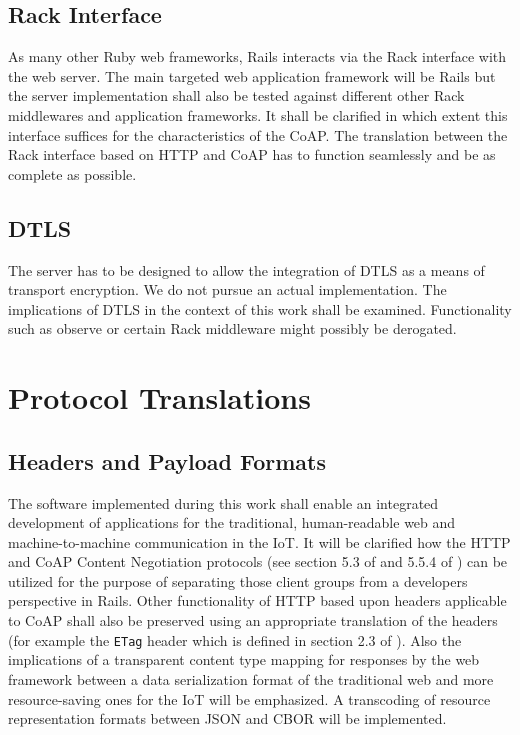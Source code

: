 	\subsection{Rack Interface}

		As many other Ruby web frameworks, \ac{Rails} interacts via the Rack
		interface with the web server. The main targeted web application
		framework will be \ac{Rails} but the server implementation shall also
		be tested against different other Rack middlewares and application
		frameworks. It shall be clarified in which extent this interface
		suffices for the characteristics of the \acf{CoAP}. The translation
		between the Rack interface based on \ac{HTTP} and \ac{CoAP} has to
		function seamlessly and be as complete as possible.

	\subsection{\acs{DTLS}}

		The server has to be designed to allow the integration of \ac{DTLS}
		\cite{dtls} as a means of transport encryption. We do not pursue an
		actual implementation. The implications of \ac{DTLS} in the context of
		this work shall be examined. Functionality such as observe or certain
		Rack middleware might possibly be derogated.

\section{Protocol Translations}


	\subsection{Headers and Payload Formats}


		The software implemented during this work shall enable an integrated
		development of applications for the traditional, human-readable web and
		machine-to-machine communication in the \ac{IoT}. It will be clarified
		how the \ac{HTTP} and \ac{CoAP} Content Negotiation protocols (see
		section 5.3 of \cite{http-1} and 5.5.4 of \cite{coap}) can be utilized
		for the purpose of separating those client groups from a developers
		perspective in \ac{Rails}. Other functionality of \ac{HTTP} based upon
		headers applicable to \ac{CoAP} shall also be preserved using an
		appropriate translation of the headers (for example the \texttt{ETag}
		header which is defined in section 2.3 of \cite{http-2}). Also the
		implications of a transparent content type mapping for responses by the
		web framework between a data serialization format of the traditional
		web and more resource-saving ones for the \ac{IoT} will be emphasized.
		A transcoding of resource representation formats between \ac{JSON}
		\cite{json} and \ac{CBOR} \cite{cbor} will be implemented.

